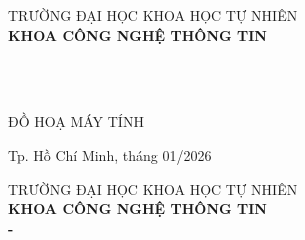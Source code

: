 \begin{titlepage}

\begin{center}
TRƯỜNG ĐẠI HỌC KHOA HỌC TỰ NHIÊN\\
\textbf{KHOA CÔNG NGHỆ THÔNG TIN}\\[2cm]


{ \Large \bfseries \tenSV\\[2cm]}


{ \Large \bfseries \tenKL\\[3cm]} 


\large ĐỒ HOẠ MÁY TÍNH\\


\vfill
Tp. Hồ Chí Minh, tháng 01/2026

\end{center}

\pagebreak



\begin{center}

TRƯỜNG ĐẠI HỌC KHOA HỌC TỰ NHIÊN\\
\textbf{KHOA CÔNG NGHỆ THÔNG TIN}\\[2cm]


{\large \bfseries \tenSV  - \mssv\\[1cm]} 


\end{center}
\end{titlepage}
